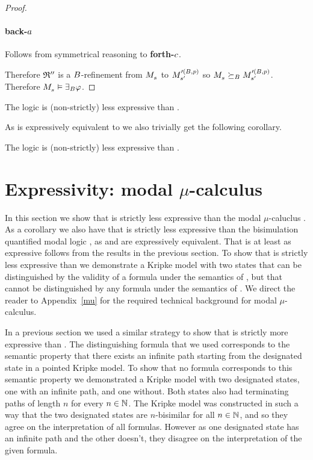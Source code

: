 \begin{proof}
\paragraph{back-$\agentA$}
Follows from symmetrical reasoning to {\bf forth-$\agentC$}.

Therefore $\refinement''$ is a $\agentsB$-refinement from $\kPModel{\kStateS}$ to $\kPModel[\prime(\agentsB, \atomP)]{\kStateSP}$ so $\kPModel{\kStateS} \simulatesBs \kPModel[\prime(\agentsB, \atomP)]{\kStateSP}$.
Therefore $\kPModel{\kStateS} \entails \somerefsBs \phi$.
\end{proof}

\begin{corollary}
The logic \logicRmlKF{} is (non-strictly) less expressive than \logicBqmlKF{}.
\end{corollary}

As \logicBqmlKF{} is expressively equivalent to \logicMuKF{} we also trivially get the following corollary. 

\begin{corollary}
The logic \logicRmlKF{} is (non-strictly) less expressive than \logicMuKF{}.
\end{corollary}

\section{Expressivity: modal $\mu$-calculus}\label{rml-k4-mu}

In this section we show that \logicRmlKF{} is strictly less expressive than the modal $\mu$-caluclus \logicMuKF{}.
As a corollary we also have that \logicRmlKF{} is strictly less expressive than the bisimulation quantified modal logic \logicBqmlKF{}, as \logicMuKF{} and \logicBqmlKF{} are expressively equivalent.
That \logicMuKF{} is at least as expressive follows from the results in the previous section.
To show that \logicRmlKF{} is strictly less expressive than \logicMuKF{} we demonstrate a \classKF{} Kripke model with two states that can be distinguished by the validity of a \langMu{} formula under the semantics of \logicMuKF{}, but that cannot be distinguished by any \langRml{} formula under the semantics of \logicRmlKF{}. 
We direct the reader to Appendix~\ref{mu} for the required technical background for modal $\mu$-calculus.

In a previous section we used a similar strategy to show that \logicRmlKF{} is strictly more expressive than \logicKF{}.
The distinguishing \langRml{} formula that we used corresponds to the semantic property that there exists an infinite path starting from the designated state in a pointed Kripke model.
To show that no \langMl{} formula corresponds to this semantic property we demonstrated a \classKF{} Kripke model with two designated states, one with an infinite path, and one without.
Both states also had terminating paths of length $n$ for every $n \in \naturals$.
The Kripke model was constructed in such a way that the two designated states are $n$-bisimilar for all $n \in \naturals$, and so they agree on the interpretation of all \langMl{} formulas.
However as one designated state has an infinite path and the other doesn't, they disagree on the interpretation of the given \langRml{} formula.

